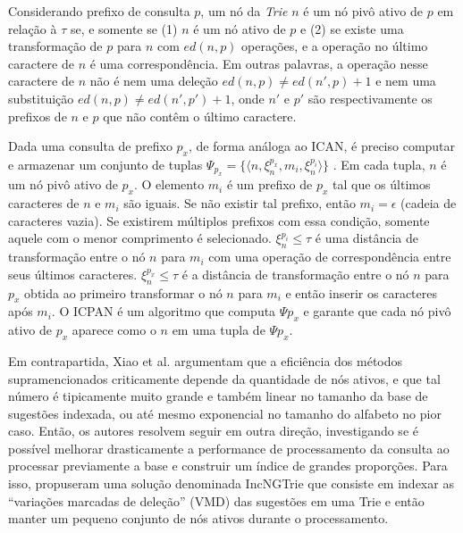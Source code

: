Considerando prefixo de consulta $p$, um nó da \textit{Trie} $n$ é um nó pivô ativo de $p$ em relação à $\tau$ se, e somente se (1) $n$ é um nó ativo de $p$ e (2) se existe uma transformação de $p$ para $n$ com $ed(n,p)$ operações, e a operação no último caractere de $n$ é uma correspondência. Em outras palavras, a operação nesse caractere de $n$ não é nem uma deleção $ed(n,p) \neq ed(n',p) + 1$ e nem uma substituição $ed(n,p) \neq ed(n', p') + 1$, onde $n'$ e $p'$ são respectivamente os prefixos de $n$ e $p$ que não contêm o último caractere.

Dada uma consulta de prefixo $p_{x}$, de forma análoga ao ICAN, é preciso computar e armazenar um conjunto de tuplas $\Psi_{p_{x}} = \{ \langle n, \xi_{n}^{p_{x}}, m_{i}, \xi_{n}^{p_{i}} \rangle \}$ \citep{li2011efficient}. Em cada tupla, $n$ é um nó pivô ativo de $p_{x}$. O elemento $m_{i}$ é um prefixo de $p_{x}$ tal que os últimos caracteres de $n$ e $m_{i}$ são iguais. Se não existir tal prefixo, então $m_{i} = \epsilon$ (cadeia de caracteres vazia). Se existirem múltiplos prefixos com essa condição, somente aquele com o menor comprimento é selecionado. $\xi_{n}^{p_{i}} \leq \tau$ é uma distância de transformação entre o nó $n$ para $m_{i}$ com uma operação de correspondência entre seus últimos caracteres. $\xi_{n}^{p_{x}} \leq \tau$ é a distância de transformação entre o nó $n$ para $p_{x}$ obtida ao primeiro transformar o nó $n$ para $m_{i}$ e então inserir os caracteres após $m_{i}$. O ICPAN é um algoritmo que computa $\Psi{p_{x}}$ e garante que cada nó pivô ativo de $p_{x}$ aparece como o $n$ em uma tupla de $\Psi{p_{x}}$.

Em contrapartida, Xiao et al. \citep{xiao2013efficient} argumentam que a eficiência dos métodos supramencionados criticamente depende da quantidade de nós ativos, e que tal número é tipicamente muito grande e também linear no tamanho da base de sugestões indexada, ou até mesmo exponencial no tamanho do alfabeto no pior caso. Então, os autores resolvem seguir em outra direção, investigando se é possível melhorar drasticamente a performance de processamento da consulta ao processar previamente a base e construir um índice de grandes proporções. Para isso, propuseram uma solução denominada IncNGTrie que consiste em indexar as ``variações marcadas de deleção'' (VMD) das sugestões em uma Trie e então manter um pequeno conjunto de nós ativos durante o processamento. 

